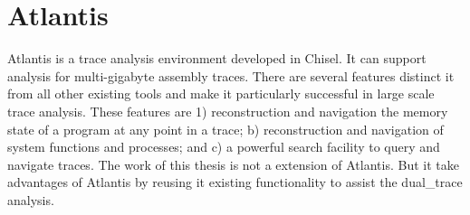 \section{Atlantis}
Atlantis is a trace analysis environment developed in Chisel. It can support analysis for multi-gigabyte assembly traces. There are several features distinct it from all other existing tools and make it particularly successful in large scale trace analysis. These features are 1) reconstruction and navigation the memory state of a program at any point in a trace; b) reconstruction and navigation of system functions and processes; and c) a powerful search facility to query and navigate traces. The work of this thesis is not a extension of Atlantis. But it take advantages of Atlantis by reusing it existing functionality to assist the dual\_trace analysis.




